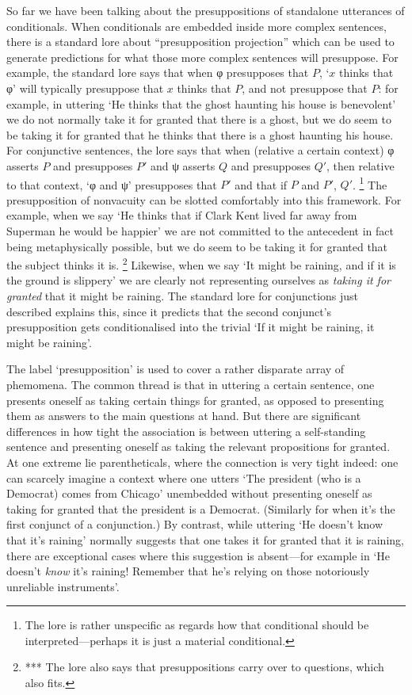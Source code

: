 \documentclass[If.tex]{subfiles}
\begin{document}
So far we have been talking about the presuppositions of standalone utterances of conditionals. When conditionals are embedded inside more complex sentences, there is a standard lore about “presupposition projection” which can be used to generate predictions for what those more complex sentences will presuppose. For example, the standard lore says that when φ presupposes that $P$, ‘$x$ thinks that φ’ will typically presuppose that $x$ thinks that $P$, and not presuppose that $P$: for example, in uttering ‘He thinks that the ghost haunting his house is benevolent’ we do not normally take it for granted that there is a ghost, but we do seem to be taking it for granted that he thinks that there is a ghost haunting his house. For conjunctive sentences, the lore says that when (relative a certain context) φ asserts $P$ and presupposes $P'$ and ψ asserts $Q$ and presupposes $Q'$, then relative to that context, ‘φ and ψ’ presupposes that $P'$ and that if $P$ and $P'$, $Q'$.%
\footnote{The lore is rather unspecific as regards how that conditional should be interpreted---perhaps it is just a material conditional.}
 The presupposition of nonvacuity can be slotted comfortably into this framework. For example, when we say ‘He thinks that if Clark Kent lived far away from Superman he would be happier’ we are not committed to the antecedent in fact being metaphysically possible, but we do seem to be taking it for granted that the subject thinks it is.%
\footnote{*** The lore also says that presuppositions carry over to questions, which also fits.}
 Likewise, when we say ‘It might be raining, and if it is the ground is slippery’ we are clearly not representing ourselves as \emph{taking it for granted} that it might be raining. The standard lore for conjunctions just described explains this, since it predicts that the second conjunct's presupposition gets conditionalised into the trivial ‘If it might be raining, it might be raining’.

The label ‘presupposition’ is used to cover a rather disparate array of phemomena. The common thread is that in uttering a certain sentence, one presents oneself as taking certain things for granted, as opposed to presenting them as answers to the main questions at hand. But there are significant differences in how tight the association is between uttering a self-standing sentence and presenting oneself as taking the relevant propositions for granted. At one extreme lie parentheticals, where the connection is very tight indeed: one can scarcely imagine a context where one utters ‘The president (who is a Democrat) comes from Chicago’ unembedded without presenting oneself as taking for granted that the president is a Democrat. (Similarly for when it's the first conjunct of a conjunction.) By contrast, while uttering ‘He doesn't know that it's raining’ normally suggests that one takes it for granted that it is raining, there are exceptional cases where this suggestion is absent---for example in ‘He doesn't \emph{know} it's raining! Remember that he's relying on those notoriously unreliable instruments’.
\end{document}
